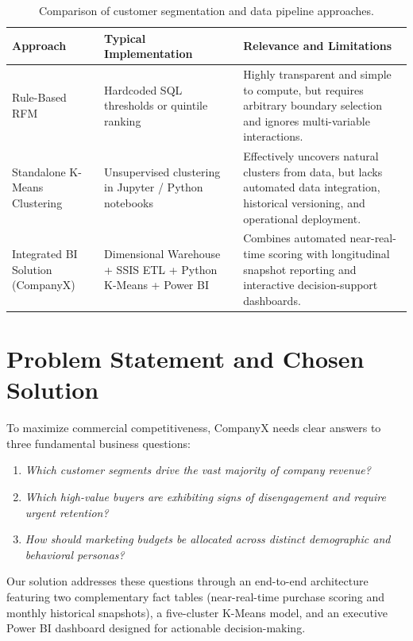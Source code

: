 \begin{table}[htbp]
\centering
\caption{Comparison of customer segmentation and data pipeline approaches.}
\label{tab:comparative_analysis}
\small
\begin{tabular}{|p{3.2cm}|p{4.2cm}|p{7.3cm}|}
\hline
\textbf{Approach} & \textbf{Typical Implementation} & \textbf{Relevance and Limitations} \\ \hline
Rule-Based RFM & Hardcoded SQL thresholds or quintile ranking & Highly transparent and simple to compute, but requires arbitrary boundary selection and ignores multi-variable interactions. \\ \hline
Standalone K-Means Clustering & Unsupervised clustering in Jupyter / Python notebooks & Effectively uncovers natural clusters from data, but lacks automated data integration, historical versioning, and operational deployment. \\ \hline
Integrated BI Solution (CompanyX) & Dimensional Warehouse + SSIS ETL + Python K-Means + Power BI & Combines automated near-real-time scoring with longitudinal snapshot reporting and interactive decision-support dashboards. \\ \hline
\end{tabular}
\end{table}

\section{Problem Statement and Chosen Solution}
To maximize commercial competitiveness, CompanyX needs clear answers to three fundamental business questions:
\begin{enumerate}
    \item \emph{Which customer segments drive the vast majority of company revenue?}
    \item \emph{Which high-value buyers are exhibiting signs of disengagement and require urgent retention?}
    \item \emph{How should marketing budgets be allocated across distinct demographic and behavioral personas?}
\end{enumerate}
Our solution addresses these questions through an end-to-end architecture featuring two complementary fact tables (near-real-time purchase scoring and monthly historical snapshots), a five-cluster K-Means model, and an executive Power BI dashboard designed for actionable decision-making.
